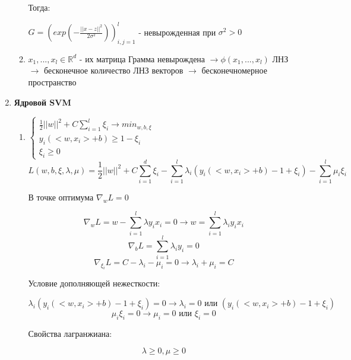 \documentclass[a4paper, 12pt]{article}
\begin{document}
\begin{enumerate}
\begin{enumerate}
        Тогда:
        
        $G = (exp\left(-\frac{||x - z||^{2}}{2\sigma^{2}}\right))^{l}_{i, j = 1}$ - невырожденная при $\sigma^{2} > 0$
        \item $x_{1}, ..., x_{l} \in \mathbb{R}^{d}$ - их матрица Грамма невырождена $\rightarrow \phi(x_{1}, ..., x_{l})$ ЛНЗ $\rightarrow$ бесконечное количество ЛНЗ векторов $\rightarrow$ бесконечномерное пространство
    \end{enumerate}
    \item \textbf{Ядровой SVM}
    \begin{enumerate}
        \item $ \begin{cases}
        \frac{1}{2}||w||^{2} + C\sum_{i = 1}^{l} \xi_{i} \rightarrow min_{w, b, \xi} \\
        y_{i}(<w, x_{i}> + b) \geq 1 - \xi_{i} \\
        \xi_{i} \geq 0
        \end{cases} $
        \[L(w, b, \xi, \lambda, \mu) = \frac{1}{2}||w||^2 + C\sum_{i = 1}^{d}\xi_i - \sum_{i = 1}^{l}\lambda_i (y_i(<w, x_i> + b) - 1 + \xi_i) - \sum_{i = 1}^l \mu_i \xi_i\]
        
        В точке оптимума $\nabla_w L = 0$
        
        \[\nabla_w L = w - \sum_{i = 1}^l \lambda y_i x_i = 0 \rightarrow w = \sum_{i = 1}^l \lambda_i y_i x_i\]
        \[\nabla_b L = \sum_{i = 1}^{l} \lambda_i y_i = 0\]
        \[\nabla_{\xi_i} L = C - \lambda_i - \mu_i = 0 \rightarrow \lambda_i + \mu_i = C\]
        
        Условие дополняющей нежесткости:
        
        \[\lambda_i (y_i(<w, x_i> + b) - 1 + \xi_i) = 0 \rightarrow \lambda_i = 0 \textrm{ или } (y_i(<w, x_i> + b) - 1 + \xi_i)\]
        \[\mu_i \xi_i = 0 \rightarrow \mu_i = 0 \textrm{ или } \xi_i = 0\]

        Свойства лагранжиана:

        \[\lambda \geq 0, \mu \geq 0\]


\end{enumerate}
\end{enumerate}
\end{document}
